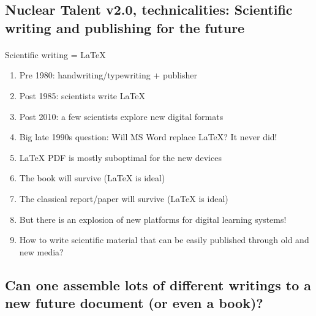 \documentclass[%
oneside,                 %
final,                   %
10pt]{article}
\begin{document}
\subsection*{Nuclear Talent v2.0, technicalities: Scientific writing and publishing for the future}

\paragraph{}
Scientific writing = {\LaTeX}

\begin{enumerate}
\item Pre 1980: handwriting/typewriting + publisher

\item Post 1985: scientists write {\LaTeX}

\item Post 2010: a few scientists explore new digital formats

\item Big late 1990s question: Will MS Word replace {\LaTeX}? It never did!

\item {\LaTeX} PDF is mostly suboptimal for the new devices

\item The book will survive ({\LaTeX} is ideal)

\item The classical report/paper will survive ({\LaTeX} is ideal)

\item But there is an explosion of new platforms for digital learning systems!

\item How to write scientific material that can be easily published through old and new media?
\end{enumerate}

\noindent




\subsection*{Can one assemble lots of different writings to a new future document (or even a book)?}

\end{document}
